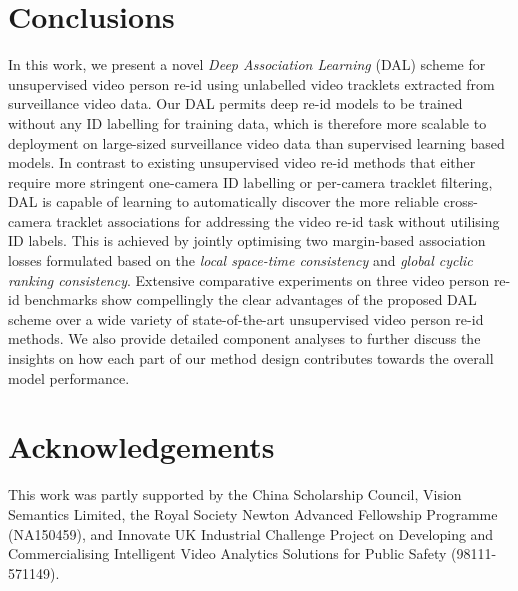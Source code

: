 \documentclass{bmvc2k}
\begin{document}
\section{Conclusions}
In this work, we present a novel {\em Deep Association Learning}
(DAL) scheme for unsupervised video person re-id using  
unlabelled video tracklets extracted from surveillance video data. 
Our DAL permits deep re-id models to be trained without any ID labelling
for training data, which is therefore more scalable to deployment
on large-sized surveillance video data than supervised learning based models. 
In contrast to existing unsupervised video re-id methods that either require more
stringent one-camera ID labelling or per-camera tracklet
filtering, DAL is capable of learning to
automatically discover the more reliable cross-camera tracklet associations
for addressing the video re-id task without utilising ID labels. This is achieved by jointly optimising two margin-based association
losses formulated based on the 
{\em local space-time consistency} and {\em global cyclic ranking consistency}. Extensive comparative experiments on three video person
re-id benchmarks show compellingly the clear advantages of the proposed
DAL scheme over a wide variety of state-of-the-art unsupervised video person re-id methods.
We also provide detailed component analyses to further discuss the insights on how
each part of our method design contributes towards the overall model performance.


\vspace{-0.2cm}
\section*{Acknowledgements}
{This work was partly supported by the China Scholarship Council, Vision Semantics Limited, the Royal Society Newton Advanced Fellowship Programme (NA150459), and Innovate UK Industrial Challenge Project on Developing and Commercialising Intelligent Video Analytics Solutions for Public Safety (98111-571149).}


\newpage

\end{document}
